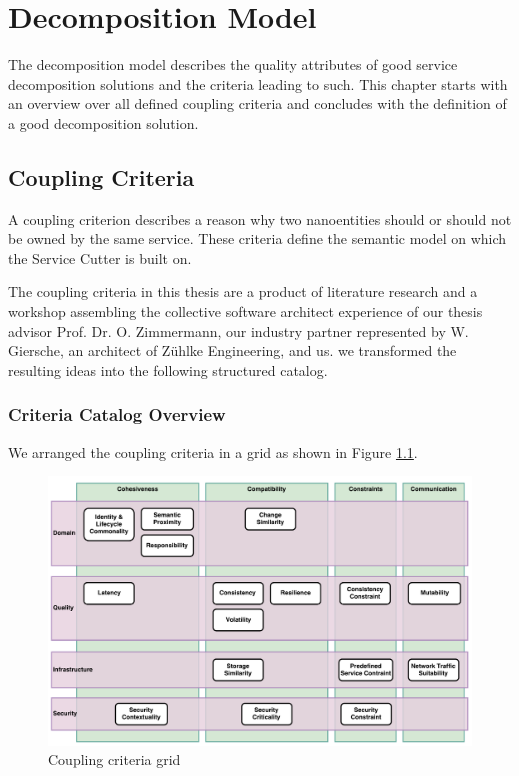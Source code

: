 \chapter{Decomposition Model}
The decomposition model describes the quality attributes of good service decomposition solutions and the criteria leading to such. This chapter starts with an overview over all defined coupling criteria and concludes with the definition of a good decomposition solution. 

\section{Coupling Criteria}
\label{sec:couplingCriteria}

A coupling criterion describes a reason why two nanoentities should or should not be owned by the same service. These criteria define the semantic model on which the Service Cutter is built on. 

The coupling criteria in this thesis are a product of literature research and a workshop assembling the collective software architect experience of our thesis advisor Prof. Dr. O. Zimmermann, our industry partner represented by W. Giersche, an architect of Zühlke Engineering, and us. we transformed the resulting ideas into the following structured catalog.

\subsection{Criteria Catalog Overview}
\label{subsec:couplingCriteriaOverview}

We arranged the coupling criteria in a grid as shown in Figure \ref{fig:cc_grid}.

\begin{figure}[H]
	\includegraphics[scale=0.5]{diagrams/CouplingCatalog.pdf}
	\caption{Coupling criteria grid}
	\label{fig:cc_grid}
\end{figure}

